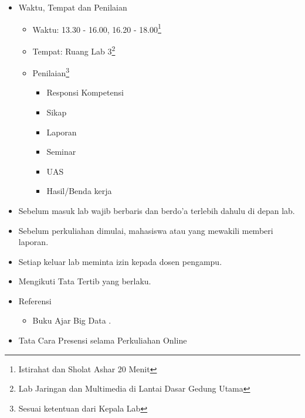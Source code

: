 \documentclass[a4paper]{tufte-handout}
\begin{document}
\begin{maybe}
\begin{itemize}
\item Waktu, Tempat dan Penilaian

\begin{itemize}
\item Waktu: 13.30 - 16.00, 16.20 - 18.00\footnote{Istirahat dan Sholat Ashar 20 Menit}
\item Tempat: Ruang Lab 3\footnote{Lab Jaringan dan Multimedia di Lantai Dasar Gedung Utama}
\item Penilaian\footnote{Sesuai ketentuan dari Kepala Lab}

\begin{multicols}{2}
\begin{itemize}
\item Responsi Kompetensi
\item Sikap
\item Laporan
\item Seminar
\item UAS
\item Hasil/Benda kerja
\end{itemize}
\end{multicols}
\end{itemize}

\item Sebelum masuk lab wajib berbaris dan berdo'a terlebih dahulu di depan lab.
\item Sebelum perkuliahan dimulai, mahasiswa atau yang mewakili memberi laporan.
\item Setiap keluar lab meminta izin kepada dosen pengampu.
\item Mengikuti Tata Tertib yang berlaku.
\item Referensi

\begin{itemize}
\item Buku Ajar Big Data \citep{Mursyidah2020}.
\end{itemize}

\item Tata Cara Presensi selama Perkuliahan Online


\end{itemize}
\end{maybe}
\end{document}
